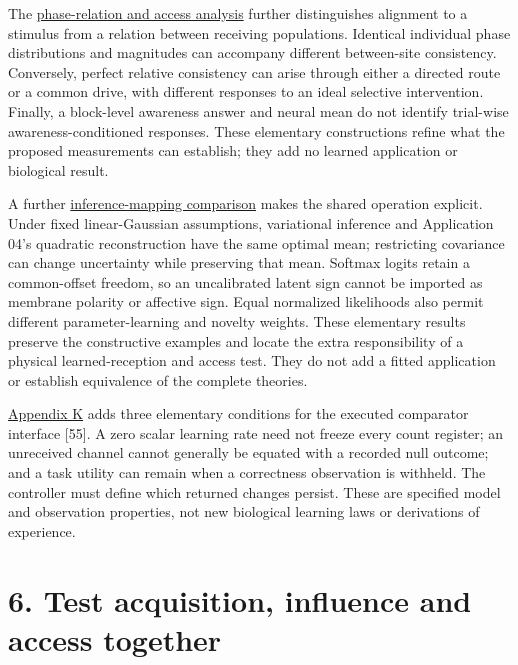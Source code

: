 \documentclass[
  american,
  11pt,
  letterpaper,
]{article}
\begin{document}
The \href{https://raw.githubusercontent.com/v5ma/v5ma.github.io/master/papers/companions/learning-to-feel-v1.0/Learning-to-Feel-Technical-Supplement-v1.0.pdf\#appendix-h}{phase-relation and access analysis} further distinguishes alignment to a stimulus from a relation between receiving populations. Identical individual phase distributions and magnitudes can accompany different between-site consistency. Conversely, perfect relative consistency can arise through either a directed route or a common drive, with different responses to an ideal selective intervention. Finally, a block-level awareness answer and neural mean do not identify trial-wise awareness-conditioned responses. These elementary constructions refine what the proposed measurements can establish; they add no learned application or biological result.

A further \href{https://raw.githubusercontent.com/v5ma/v5ma.github.io/master/papers/companions/learning-to-feel-v1.0/Learning-to-Feel-Technical-Supplement-v1.0.pdf\#appendix-j}{inference-mapping comparison} makes the shared operation explicit. Under fixed linear-Gaussian assumptions, variational inference and Application 04's quadratic reconstruction have the same optimal mean; restricting covariance can change uncertainty while preserving that mean. Softmax logits retain a common-offset freedom, so an uncalibrated latent sign cannot be imported as membrane polarity or affective sign. Equal normalized likelihoods also permit different parameter-learning and novelty weights. These elementary results preserve the constructive examples and locate the extra responsibility of a physical learned-reception and access test. They do not add a fitted application or establish equivalence of the complete theories.

\href{https://raw.githubusercontent.com/v5ma/v5ma.github.io/master/papers/companions/learning-to-feel-v1.0/Learning-to-Feel-Technical-Supplement-v1.0.pdf\#appendix-k}{Appendix K} adds three elementary conditions for the executed comparator interface {[}55{]}. A zero scalar learning rate need not freeze every count register; an unreceived channel cannot generally be equated with a recorded null outcome; and a task utility can remain when a correctness observation is withheld. The controller must define which returned changes persist. These are specified model and observation properties, not new biological learning laws or derivations of experience.

\section{6. Test acquisition, influence and access together}\label{test-acquisition-influence-and-access-together}
\end{document}
